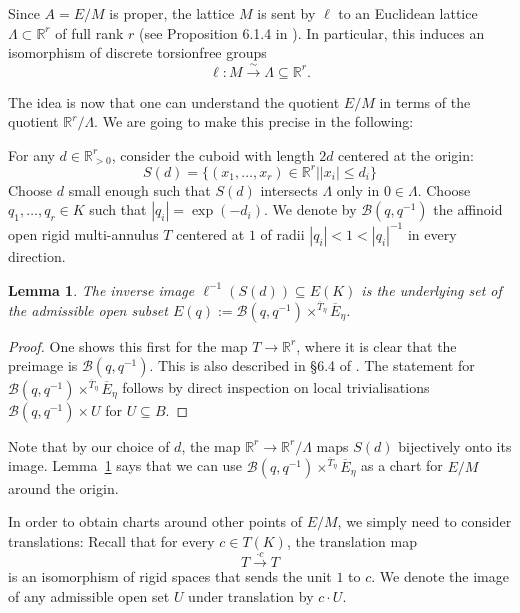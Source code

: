 \documentclass[10pt,oneside]{amsart}
\newtheorem{lemma}[theorem]{Lemma}
\theoremstyle{definition}
\begin{document}
	Since $A=E/M$ is proper, the lattice $M$ is sent by $\ell$ to an Euclidean lattice $\Lambda \subset \mathbb R^r$ of full rank $r$ (see Proposition 6.1.4 in \cite{rigid geometry of curves}). In particular, this induces an isomorphism of discrete torsionfree groups
	\[\ell:M\xrightarrow{\sim} \Lambda\subseteq\mathbb R^r.\]
	
	The idea is now that one can understand the quotient $E/M$ in terms of the quotient $\mathbb R^r/\Lambda$. We are going to make this precise in the following:
	
	For any $d\in \mathbb R_{> 0}^r$, consider the cuboid with length $2d$ centered at the origin:
	\[S(d) = \{(x_1,\dots,x_r)\in \mathbb R^r | |x_i|\leq d_i \}\]
	Choose $d$ small enough such that $S(d)$ intersects $\Lambda$ only in $0\in \Lambda$. Choose
	 $q_1,\dots,q_r\in K$ such that $|q_i|=\exp(-d_i)$. We denote by $\mathcal B(q,q^{-1})$ the affinoid open rigid multi-annulus $T$ centered at $1$ of radii $|q_i|< 1 < |q_i|^{-1}$ in every direction.
	
	\begin{lemma}\label{cube around origin gives local chart for E/M}
		The inverse image $\ell^{-1}(S(d))\subseteq E(K)$ is the underlying set of the admissible open subset $E(q):=\mathcal B(q,q^{-1})\times^{\overline{T}_\eta}\overline{E}_\eta$.
	\end{lemma}
	\begin{proof}
		One shows this first for the map $T\rightarrow \mathbb R^r$, where it is clear that the preimage is $\mathcal B(q,q^{-1})$. This is also described in \S 6.4 of \cite{FvdP}. The statement for $\mathcal B(q,q^{-1})\times^{\overline{T}_\eta}\overline{E}_\eta$ follows by direct inspection on local trivialisations $\mathcal B(q,q^{-1})\times U$ for $U\subseteq B$.
	\end{proof}
	
	
	Note that by our choice of $d$, the map $\mathbb R^r\rightarrow \mathbb R^r/\Lambda$ maps $S(d)$ bijectively onto its image. 
	Lemma~\ref{cube around origin gives local chart for E/M} says that we can use $\mathcal B(q,q^{-1})\times^{\overline{T}_\eta}\overline{E}_\eta$ as a chart for $E/M$ around the origin.
	
	In order to obtain charts around other points of $E/M$, we simply need to consider translations: Recall that for every $c\in T(K)$, the translation map
	\[T\xrightarrow{\cdot c}T\]
	is an isomorphism of rigid spaces that sends the unit $1$ to $c$. We denote the image of any admissible open set $U$ under translation by $c\cdot U$.
	
\end{document}
